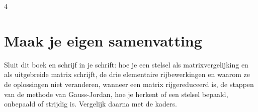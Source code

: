 \begin{oefeningen}

\end{oefeningen}


\begin{oefeningen}




\begin{alleenvoor}{4}

\end{alleenvoor}

\end{oefeningen}


\ifzelfstudie
\section*{Maak je eigen samenvatting}
Sluit dit boek en schrijf in je schrift: hoe je een stelsel als matrixvergelijking en als uitgebreide matrix schrijft, de drie elementaire rijbewerkingen en waarom ze de oplossingen niet veranderen, wanneer een matrix rijgereduceerd is, de stappen van de methode van Gauss-Jordan, hoe je herkent of een stelsel bepaald, onbepaald of strijdig is. Vergelijk daarna met de kaders.
\fi
